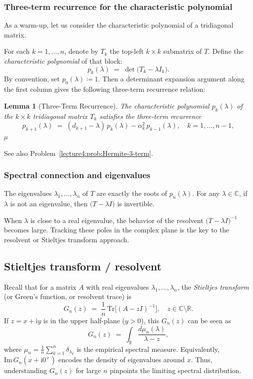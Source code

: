 \documentclass[letterpaper,11pt,oneside,reqno]{book}
\numberwithin{equation}{chapter}  %
\newtheorem{lemma}[proposition]{Lemma}
\theoremstyle{definition}
\begin{document}
\subsubsection{Three-term recurrence for the characteristic polynomial}

As a warm-up, let us consider the characteristic polynomial of a tridiagonal matrix.

For each \(k=1,\dots,n\), denote by \(T_k\) the top-left \(k\times k\) submatrix of \(T\).  Define the \emph{characteristic polynomial} of that block:
\[
  p_k(\lambda) \;=\; \det\bigl(T_k - \lambda I_k\bigr).
\]
By convention, set \(p_0(\lambda)\coloneqq 1\).  Then a determinant expansion argument along the first column gives the following three-term recurrence relation:

\begin{lemma}[Three-Term Recurrence]
\label{lecture4:lem:3term}
The characteristic polynomial \(p_k(\lambda)\) of the \(k\times k\) tridiagonal matrix \(T_k\) satisfies the three-term recurrence
\[
	p_{k+1}(\lambda)
	\;=\;
	(d_{k+1} - \lambda)\,p_k(\lambda) - \alpha_k^2\,p_{k-1}(\lambda),
	\quad
	k=1,\dots,n-1,
\]µ

\end{lemma}

See also Problem~\ref{lecture4:prob:Hermite-3-term}.

\subsubsection{Spectral connection and eigenvalues}

The eigenvalues \(\lambda_1,\dots,\lambda_n\) of \(T\) are exactly the roots of \(p_n(\lambda)\).  For any \(\lambda \in \mathbb{C}\), if \(\lambda\) is not an eigenvalue, then \(\bigl(T - \lambda I\bigr)\) is invertible.

When \(\lambda\) is close to a real eigenvalue, the behavior of the resolvent \(\bigl(T-\lambda I\bigr)^{-1}\) becomes large.  Tracking these poles in the complex plane is the key to the resolvent or Stieltjes transform approach.

\subsection{Stieltjes transform / resolvent}
\label{lecture4:sec:stieltjes-def}

Recall that for a matrix \(A\) with real eigenvalues \(\lambda_1,\dots,\lambda_n\), the \emph{Stieltjes transform} (or Green’s function, or resolvent trace) is
\[
  G_n(z)
  \;=\;
  \frac{1}{n}\,\mathrm{Tr}\bigl[(A - zI)^{-1}\bigr],
  \quad
  z\in \mathbb{C}\setminus\mathbb{R}.
\]
If \(z=x+\mathrm{i}y\) is in the upper half-plane (\(y>0\)), this $G_n(z)$ can be seen as
\[
  G_n(z)
  \;=\;
  \int_{\mathbb{R}}\!\!\frac{d\mu_n(\lambda)}{\lambda - z},
\]
where \(\mu_n = \frac{1}{n}\sum_{k=1}^n \delta_{\lambda_k}\) is the empirical spectral measure.  Equivalently, \(\mathrm{Im}\,G_n(x+\mathrm{i}0^+)\) encodes the density of eigenvalues around \(x\).  Thus, understanding $G_n(z)$ for large $n$ pinpoints the limiting spectral distribution.
\end{document}
